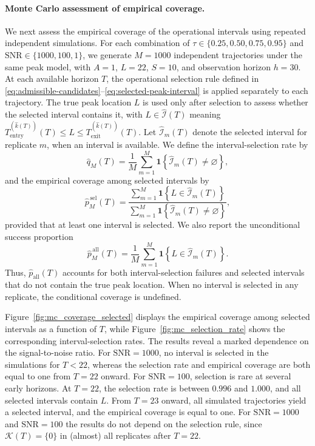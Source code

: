 \documentclass[12pt,a4paper]{article}
\begin{document}
\paragraph{Monte Carlo assessment of empirical coverage.}
We next assess the empirical coverage of the operational intervals using repeated independent simulations. For each combination of $\tau\in\{0.25,0.50,0.75,0.95\}$ and $\mathrm{SNR}\in\{1000,100,1\}$, we generate $M=1000$ independent trajectories under the same peak model, with $A=1$, $L=22$, $S=10$, and observation horizon $h=30$. At each available horizon $T$, the operational selection rule defined in \eqref{eq:admissible-candidates}--\eqref{eq:selected-peak-interval} is applied separately to each trajectory. The true peak location $L$ is used only after selection to assess whether the selected interval contains it, with
$L\in\widehat{\mathcal I}(T)$ meaning
$T_{\mathrm{entry}}^{(\widehat k(T))}(T)\le L\le T_{\mathrm{exit}}^{(\widehat k(T))}(T)$.
Let $\widehat{\mathcal I}_m(T)$ denote the selected interval for replicate $m$, when an interval is available. We define the interval-selection rate by
\[
\widehat q_M(T)
=
\frac{1}{M}
\sum_{m=1}^M
\mathbf 1\!\left\{
\widehat{\mathcal I}_m(T) \neq \varnothing
\right\},
\]
and the empirical coverage among selected intervals by
\[
\widehat p^{\,\mathrm{sel}}_M(T)
=
\frac{
	\displaystyle
	\sum_{m=1}^M
	\mathbf 1\!\left\{
	L \in \widehat{\mathcal I}_m(T)
	\right\}
}{
	\displaystyle
	\sum_{m=1}^M
	\mathbf 1\!\left\{
	\widehat{\mathcal I}_m(T) \neq \varnothing
	\right\}
},
\]
provided that at least one interval is selected. We also report the unconditional success proportion
\[
\widehat p^{\,\mathrm{all}}_M(T)
=
\frac{1}{M}
\sum_{m=1}^M
\mathbf 1\!\left\{
L \in \widehat{\mathcal I}_m(T)
\right\}.
\]
Thus, $\widehat p_{\mathrm{all}}(T)$ accounts for both interval-selection failures and selected intervals that do not contain the true peak location. When no interval is selected in any replicate, the conditional coverage is undefined.

Figure~\ref{fig:mc_coverage_selected} displays the empirical coverage among selected intervals as a function of $T$, while Figure~\ref{fig:mc_selection_rate} shows the corresponding interval-selection rates. The results reveal a marked dependence on the signal-to-noise ratio. For $\mathrm{SNR}=1000$, no interval is selected in the simulations for $T<22$, whereas the selection rate and empirical coverage are both equal to one from $T=22$ onward.
For $\mathrm{SNR}=100$, selection is rare at several early horizons. At
$T=22$, the selection rate is between $0.996$ and $1.000$, and all selected
intervals contain $L$. From $T=23$ onward, all simulated trajectories yield a
selected interval, and the empirical coverage is equal to one.
For $\mathrm{SNR}=1000$ and $\mathrm{SNR}=100$ the results do not depend on the selection rule, since $\mathcal K(T)=\{0\}$ in (almost) all replicates after $T=22$.
\end{document}
